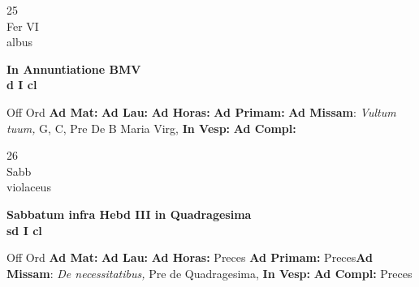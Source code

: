 \documentclass[10pt, openany]{book}
\begin{document}
    \begin{center}
        \begin{minipage}{3.5in}
            \vspace{2em}
            \begin{minipage}{0.5in}
                {\Huge 25} \\
                {\normalsize Fer VI} \\
                {\normalsize albus}
            \end{minipage}
            \begin{minipage}{3.0in}
                \textbf{ \large In Annuntiatione BMV \\
                \textnormal{\normalsize d I cl}} \\ 
            \end{minipage}
            \begin{justify}Off Ord
                \textbf{Ad Mat: }
                \textbf{Ad Lau: }
                \textbf{Ad Horas: }
                \textbf{Ad Primam: }\textbf{Ad Missam}: \textit{Vultum tuum,} G, C, Pre De B Maria Virg,  
                \textbf{In Vesp: }
                \textbf{Ad Compl: }
            \end{justify}
        \end{minipage}
    \end{center}

    \begin{center}
        \begin{minipage}{3.5in}
            \vspace{2em}
            \begin{minipage}{0.5in}
                {\Huge 26} \\
                {\normalsize Sabb} \\
                {\normalsize violaceus}
            \end{minipage}
            \begin{minipage}{3.0in}
                \textbf{ \large Sabbatum infra Hebd III in Quadragesima \\
                \textnormal{\normalsize sd I cl}} \\ 
            \end{minipage}
            \begin{justify}Off Ord
                \textbf{Ad Mat: }
                \textbf{Ad Lau: }
                \textbf{Ad Horas: }Preces
                \textbf{Ad Primam: }Preces\textbf{Ad Missam}: \textit{De necessitatibus,} Pre de Quadragesima,  
                \textbf{In Vesp: }
                \textbf{Ad Compl: }Preces
            \end{justify}
        \end{minipage}
    \end{center}
\end{document}
